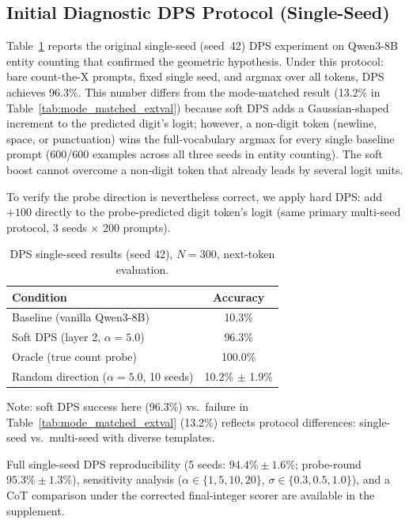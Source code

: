 \documentclass{article}
\begin{document}
\subsection{Initial Diagnostic DPS Protocol (Single-Seed)}
\label{sec:dps_initial}

Table~\ref{tab:dps} reports the original single-seed (seed~42) DPS experiment
on Qwen3-8B entity counting that confirmed the geometric hypothesis. Under this
protocol: bare count-the-X prompts, fixed single seed, and argmax over all
tokens, DPS achieves 96.3\%. This number differs from the mode-matched result
(13.2\% in Table~\ref{tab:mode_matched_extval}) because soft DPS adds a
Gaussian-shaped increment to the predicted digit's logit; however, a non-digit
token (newline, space, or punctuation) wins the full-vocabulary argmax for
every single baseline prompt (600/600 examples across all three seeds in entity
counting). The soft boost cannot overcome a non-digit token that already leads
by several logit units.

To verify the probe direction is nevertheless correct, we apply hard DPS: add
$+100$ directly to the probe-predicted digit token's logit (same primary
multi-seed protocol, 3 seeds $\times$ 200 prompts).

\begin{table}[h]
\centering
\caption{DPS single-seed results (seed 42), $N{=}300$, next-token evaluation.}
\label{tab:dps}
\begin{tabular}{lc}
\toprule
Condition & Accuracy \\
\midrule
Baseline (vanilla Qwen3-8B) & 10.3\% \\
Soft DPS (layer 2, $\alpha=5.0$) & 96.3\% \\
Oracle (true count probe) & 100.0\% \\
Random direction ($\alpha=5.0$, 10 seeds) & 10.2\% $\pm$ 1.9\% \\
\bottomrule
\end{tabular}
\vspace{3pt}
\par\scriptsize
Note: soft DPS success here (96.3\%) vs.\ failure in Table~\ref{tab:mode_matched_extval} (13.2\%) reflects
protocol differences: single-seed vs.\ multi-seed with diverse templates.
\end{table}

Full single-seed DPS reproducibility (5 seeds: $94.4\% \pm 1.6\%$; probe-round
$95.3\% \pm 1.3\%$), sensitivity analysis ($\alpha \in \{1,5,10,20\}$,
$\sigma \in \{0.3, 0.5, 1.0\}$), and a CoT comparison under the corrected
final-integer scorer are available in the supplement.
\end{document}
